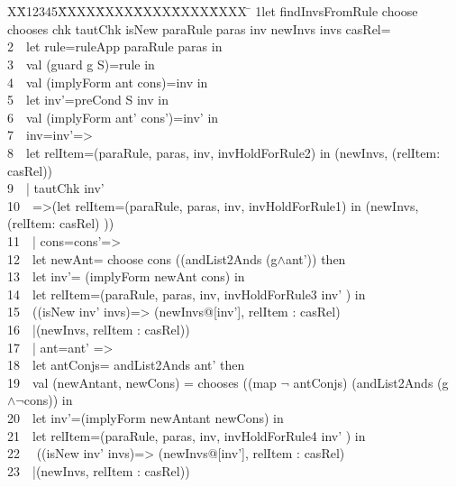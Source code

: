 \documentclass{llncs}
\newlength{\fminilength}
\newenvironment{fmini}[1][\linewidth]
  {\setlength{\fminilength}{#1\fboxsep-2\fboxrule}%
   \vspace{2ex}\noindent\begin{lrbox}{\fminibox}\begin{minipage}{\fminilength}%
   \mbox{ }\hfill\vspace{-2.5ex}}%
  {\end{minipage}\end{lrbox}\vspace{1ex}\hspace{0ex}%
   \framebox{\usebox{\fminibox}}}
\newenvironment{specification}
{\noindent\scriptsize \tt\begin{fmini}\begin{tabbing}X\=X12345\=XXXX\=XXXX\=XXXX\=XXXX\=XXXX
\=\+\kill} {\end{tabbing}\normalfont\end{fmini}}
\def \twoSpaces {\ \ }
\begin{document}
\begin{specification}
1let findInvsFromRule choose chooses chk tautChk isNew paraRule paras inv newInvs invs casRel=\\
2\twoSpaces     let rule=ruleApp paraRule paras in\\
3\twoSpaces   val (guard g  S)=rule in\\
4\twoSpaces   val (implyForm ant cons)=inv in\\


5\twoSpaces   let inv'=preCond S inv in\\
6\twoSpaces   val (implyForm ant' cons')=inv' in\\


7\twoSpaces     inv=inv'=>\\

8\twoSpaces         let relItem=(paraRule, paras, inv, invHoldForRule2) in
         (newInvs, (relItem: casRel))\\



9\twoSpaces      | tautChk inv'\\
10\twoSpaces         =>(let relItem=(paraRule, paras, inv, invHoldForRule1) in         (newInvs, (relItem: casRel)   ))\\


11\twoSpaces       | cons=cons'=>\\

12\twoSpaces       let newAnt=  choose cons ((andList2Ands (g$\wedge$ant'))     then\\

13\twoSpaces       let inv'= (implyForm newAnt cons) in\\


14\twoSpaces       let relItem=(paraRule, paras, inv,  invHoldForRule3 inv'   ) in\\

15\twoSpaces       ((isNew inv' invs)=>           (newInvs@[inv'], relItem : casRel)\\
16\twoSpaces       |(newInvs,  relItem : casRel))\\

17\twoSpaces     | ant=ant' =>\\
18\twoSpaces        let antConjs= andList2Ands ant'  then\\

19\twoSpaces        val (newAntant, newCons) = chooses ((map $\neg$ antConjs) (andList2Ands (g$\wedge \neg$cons)) in\\
20\twoSpaces        let inv'=(implyForm newAntant newCons) in\\
21\twoSpaces        let relItem=(paraRule, paras, inv,  invHoldForRule4 inv'   ) in\\
22 \twoSpaces       ((isNew inv' invs)=>         (newInvs@[inv'], relItem : casRel)\\
23\twoSpaces       |(newInvs,  relItem : casRel))\\


\end{specification}
\end{document}
